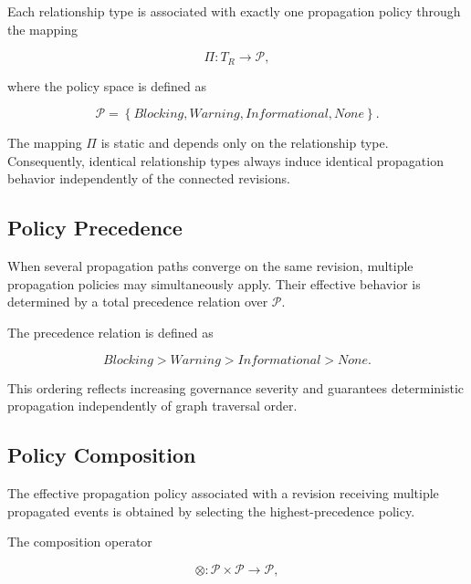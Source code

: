 \documentclass[10pt]{article}
\begin{document}
	Each relationship type is associated with exactly one propagation policy through the mapping
	
	\begin{equation}
		\Pi : T_R \rightarrow \mathcal{P},
		\label{eq:policy_function}
	\end{equation}
	
	where the policy space is defined as
	
	\begin{equation}
		\mathcal{P}=
		\left\{
		\textit{Blocking},
		\textit{Warning},
		\textit{Informational},
		\textit{None}
		\right\}.
		\label{eq:policy_set}
	\end{equation}
	
	The mapping $\Pi$ is static and depends only on the relationship type. Consequently, identical relationship types always induce identical propagation behavior independently of the connected revisions.
	
	\subsection{Policy Precedence}
	
	When several propagation paths converge on the same revision, multiple propagation policies may simultaneously apply. Their effective behavior is determined by a total precedence relation over $\mathcal{P}$.
	
	The precedence relation is defined as
	
	\begin{equation}
		\textit{Blocking}
		>
		\textit{Warning}
		>
		\textit{Informational}
		>
		\textit{None}.
		\label{eq:policy_order}
	\end{equation}
	
	This ordering reflects increasing governance severity and guarantees deterministic propagation independently of graph traversal order.
	
	\subsection{Policy Composition}
	
	The effective propagation policy associated with a revision receiving multiple propagated events is obtained by selecting the highest-precedence policy.
	
	The composition operator
	
	\begin{equation}
		\otimes :
		\mathcal{P}\times\mathcal{P}
		\rightarrow
		\mathcal{P},
		\label{eq:policy_composition}
	\end{equation}
	
\end{document}

